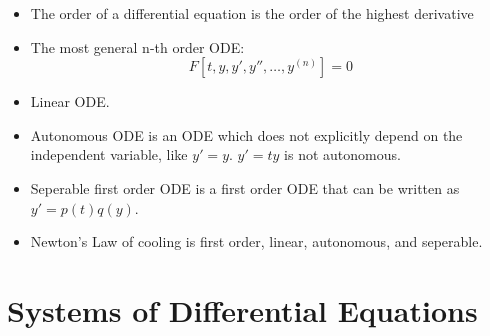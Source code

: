 \documentclass[a4paper, 10pt]{article}
\numberwithin{equation}{section}
\begin{document}
\begin{itemize}
    \item The order of a differential equation is the order of the highest derivative
    \item The most general n-th order ODE:
    \begin{equation}
        F[t,y,y',y'',\dots,y^{(n)}]=0
    \end{equation}
    \item Linear ODE.
    \item Autonomous ODE is an ODE which does not explicitly depend on the independent variable, like $y'=y$. $y'=ty$ is not autonomous.
    \item Seperable first order ODE is a first order ODE that can be written as $y'=p(t)q(y)$.
    \item Newton's Law of cooling is first order, linear, autonomous, and seperable. 
\end{itemize}

\section{Systems of Differential Equations}
\end{document}
